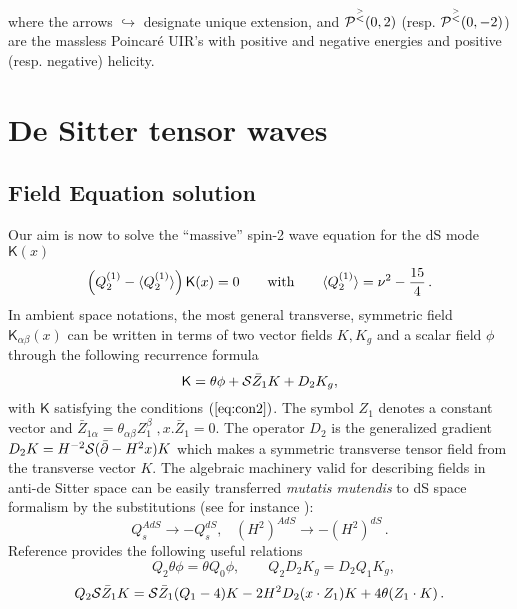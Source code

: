 \documentclass[a4paper,11pt,showpacs,preprintnumbers]{revtex4}
\def\K{\textsf{K}}
\begin{document}
where the arrows $\hookrightarrow $ designate unique extension,
and $ {\cal P}^{ \stackrel{>} {<}}(0,2)$ (resp. $ {\cal
P}^{\stackrel{>}{<}}(0,-2)$) are the massless Poincar\'e UIR's
with positive and negative energies and  positive (resp. negative)
helicity.
\setcounter{equation}{0}
\section{De Sitter tensor  waves}
\subsection{Field Equation solution}
Our aim is now to solve the ``massive'' spin-2 wave equation for
the dS  mode $\K(x)$
\begin{equation}\label{eq:wave1}
\left(Q_2^{(1)}-\langle
Q_2^{(1)}\rangle\right)\K(x)=0\qquad\mbox{with}\qquad \langle
Q_2^{(1)}\rangle=\nu^{2}-{{15}\over{4}}\,.
\end{equation}
In ambient space  notations, the most general transverse,
symmetric field $\K_{\alpha\beta}(x)$ can be written in terms of
two vector fields $K,K_g$ and a scalar field $\phi$ through the
following recurrence formula \cite{gaha}
\begin{equation}
\K=\theta\phi+{\cal S}\bar Z_1K+D_2K_g,
\label{eq:an}
\end{equation}
with $\K$ satisfying the conditions $(\ref{eq:con2})$. The symbol
$Z_1$ denotes a constant vector and  $\bar
Z_{1\alpha}=\theta_{\alpha\beta}Z_1^\beta\;,x.\bar Z_1=0$. The
operator $D_2$ is the generalized gradient $ D_2K=H^{-2}{\cal
S}(\bar
\partial-H^2 x)K$ which makes a symmetric transverse tensor field
from the transverse vector $K$. The algebraic machinery valid for
describing fields in anti-de Sitter space can be easily
transferred {\it mutatis mutendis} to dS space formalism by the
substitutions (see for instance \cite{gaha,fr,gazeau}):
$$Q_s^{AdS}\longrightarrow -Q_s^{dS},  \;\;\;(H^2)^{AdS}\longrightarrow
-(H^2)^{dS}\, .$$ Reference \cite{gazeau} provides the following
useful relations
\begin{equation}\label{eq:prop4}
\qquad Q_2\theta \phi=\theta Q_0\phi,\qquad
Q_2D_2K_{g}=D_2Q_1K_{g},\nonumber
\end{equation}
\begin{equation}
Q_2{\cal S}\bar Z_1 K={\cal S}\bar Z_1(Q_1-4)K-2H^2D_2(x\cdot
Z_1)K+4\theta (Z_1\cdot K)\,.
\end{equation}
\end{document}
